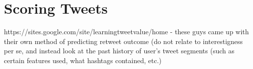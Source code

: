 \section{Scoring Tweets}
https://sites.google.com/site/learningtweetvalue/home - these guys came up with their own method of predicting retweet outcome (do not relate to interestigness per se, and instead look at the past history of user's tweet segments (such as certain features used, what hashtags contained, etc.)
